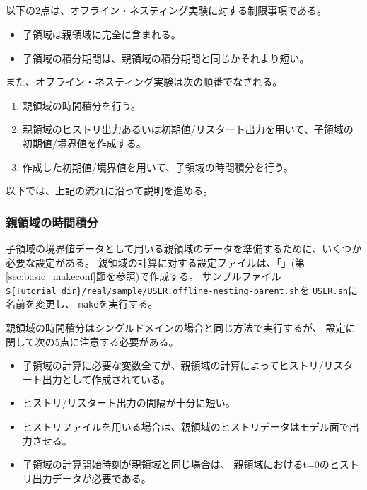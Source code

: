 \subsection{\SubsecOflineNesting} \label{subsec:nest_offline}

以下の2点は、オフライン・ネスティング実験に対する制限事項である。
\begin{itemize}
 \item 子領域は親領域に完全に含まれる。
 \item 子領域の積分期間は、親領域の積分期間と同じかそれより短い。
\end{itemize}
また、オフライン・ネスティング実験は次の順番でなされる。
\begin{enumerate}
 \item 親領域の時間積分を行う。
 \item 親領域のヒストリ出力あるいは初期値/リスタート出力を用いて、子領域の初期値/境界値を作成する。
 \item 作成した初期値/境界値を用いて、子領域の時間積分を行う。
\end{enumerate}
以下では、上記の流れに沿って説明を進める。

\subsubsection{親領域の時間積分}
子領域の境界値データとして用いる親領域のデータを準備するために、いくつか必要な設定がある。
親領域の計算に対する設定ファイルは、「\makeconftool」(第\ref{sec:basic_makeconf}節を参照)で作成する。
サンプルファイル\verb|${Tutorial_dir}/real/sample/USER.offline-nesting-parent.sh|を
\verb|USER.sh|に名前を変更し、 \verb|make|を実行する。

親領域の時間積分はシングルドメインの場合と同じ方法で実行するが、
設定に関して次の5点に注意する必要がある。

\begin{itemize}
 \item 子領域の計算に必要な変数全てが、親領域の計算によってヒストリ/リスタート出力として作成されている。
 \item ヒストリ/リスタート出力の間隔が十分に短い。
 \item ヒストリファイルを用いる場合は、親領域のヒストリデータはモデル面で出力させる。
 \item 子領域の計算開始時刻が親領域と同じ場合は、 親領域におけるt=0のヒストリ出力データが必要である。
\end{itemize}

